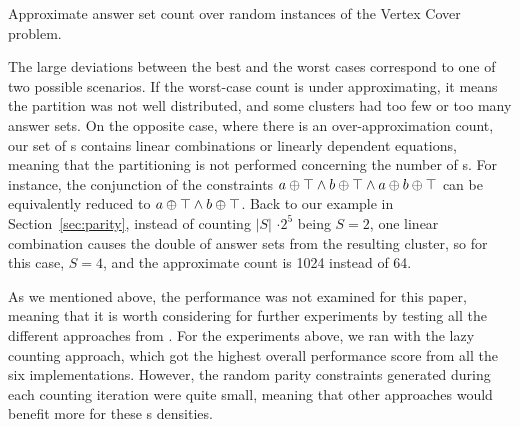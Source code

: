 \begin{table*}[t]
  \centering
  
  \caption{Approximate answer set count over random instances of the Vertex Cover problem.}\label{table:vertex_cover}
\end{table*}




The large deviations between the best and the worst cases correspond to one of two possible scenarios.
%
If the worst-case count is under approximating,
it means the partition was not well distributed, and some clusters had too few or too many answer sets. 
%
On the opposite case, where there is an over-approximation count,
our set of \XOR{}s contains linear combinations or linearly dependent equations,
meaning that the partitioning is not performed concerning the number of \XOR{}s.
% 
For instance, the conjunction of the \XOR{} constraints $a \oplus \top \land b \oplus \top \land a \oplus b \oplus \top$ can be equivalently reduced to $a \oplus \top \land b \oplus \top$. 
%
Back to our example in Section~\ref{sec:parity}, instead of counting $|S|$ $\cdot 2^5$ being $S=2$,
one linear combination causes the double of answer sets from the resulting cluster, so for this case, $S=4$, and the approximate count is 1024 instead of 64. 



As we mentioned above, the performance was not examined for this paper,
meaning that it is worth considering for further experiments by testing all the different approaches from \xorro{}.
For the experiments above, we ran \xorro{} with the lazy counting approach,
which got the highest overall performance score from all the six implementations.
However, the random parity constraints generated during each counting iteration were quite small,
meaning that other approaches would benefit more for these \XOR{}s densities.